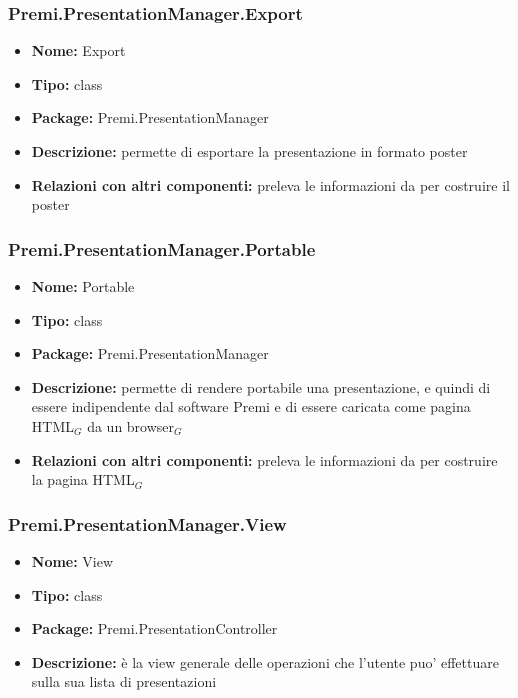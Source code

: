 \subsubsection{Premi.PresentationManager.Export}
\begin{itemize}
  \item \textbf{Nome:} Export 
  \item \textbf{Tipo:} class
  \item \textbf{Package:} Premi.PresentationManager
  \item \textbf{Descrizione:} permette di esportare la presentazione in formato poster
  \item \textbf{Relazioni con altri componenti:} preleva le informazioni da  per costruire il poster
\end{itemize}
\subsubsection{Premi.PresentationManager.Portable}
\begin{itemize}
  \item \textbf{Nome:} Portable
  \item \textbf{Tipo:} class
  \item \textbf{Package:} Premi.PresentationManager
  \item \textbf{Descrizione:} permette di rendere portabile una presentazione, e quindi di essere indipendente dal software Premi e di essere caricata come pagina HTML$_G$ da un browser$_G$
  \item \textbf{Relazioni con altri componenti:} preleva le informazioni da  per costruire la pagina HTML$_G$
\end{itemize}
\subsubsection{Premi.PresentationManager.View}
\begin{itemize}
  \item \textbf{Nome:} View
  \item \textbf{Tipo:} class
  \item \textbf{Package:} Premi.PresentationController
  \item \textbf{Descrizione:} è la view generale delle operazioni che l'utente puo' effettuare sulla sua lista di presentazioni
\end{itemize}
